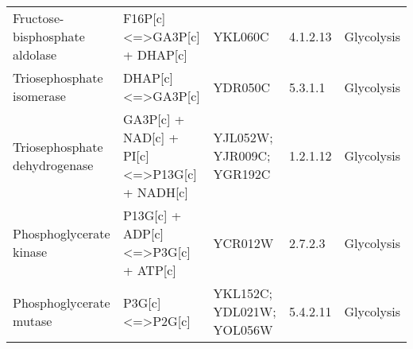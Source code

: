 \begin{table}[H]
\begin{center}
{\begin{tabular}{p{11cm}p{17cm}p{8cm}lp{5cm}}
Fructose-bisphosphate aldolase                                                            & F16P{[}c{]} \textless{}=\textgreater GA3P{[}c{]} + DHAP{[}c{]}                                                                                  & YKL060C                                                                                                                                                          & 4.1.2.13           & Glycolysis                                                                  \\
Triosephosphate isomerase                                                                 & DHAP{[}c{]} \textless{}=\textgreater GA3P{[}c{]}                                                                                                & YDR050C                                                                                                                                                          & 5.3.1.1            & Glycolysis                                                                  \\
Triosephosphate dehydrogenase                                                             & GA3P{[}c{]} + NAD{[}c{]} + PI{[}c{]} \textless{}=\textgreater P13G{[}c{]} + NADH{[}c{]}                                                         & YJL052W; YJR009C; YGR192C                                                                                                                                        & 1.2.1.12           & Glycolysis                                                                  \\
Phosphoglycerate kinase                                                                   & P13G{[}c{]} + ADP{[}c{]} \textless{}=\textgreater P3G{[}c{]} + ATP{[}c{]}                                                                       & YCR012W                                                                                                                                                          & 2.7.2.3            & Glycolysis                                                                  \\
Phosphoglycerate mutase                                                                   & P3G{[}c{]} \textless{}=\textgreater P2G{[}c{]}                                                                                                  & YKL152C; YDL021W; YOL056W                                                                                                                                        & 5.4.2.11           & Glycolysis                                                                  \\

\end{tabular}}
\end{center}
\end{table}
